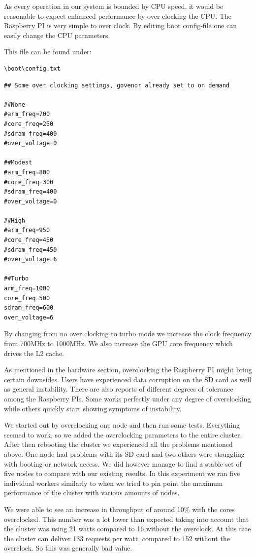 As every operation in our system is bounded by CPU speed, it would be reasonable to expect enhanced performance by over clocking the CPU. The Raspberry PI is very simple to over clock. By editing boot config-file one can easily change the CPU parameters.

This file can be found under:

\begin{lstlisting}
\boot\config.txt
\end{lstlisting} 

\begin{lstlisting}
## Some over clocking settings, govenor already set to on demand

##None
#arm_freq=700
#core_freq=250
#sdram_freq=400
#over_voltage=0

##Modest
#arm_freq=800
#core_freq=300
#sdram_freq=400
#over_voltage=0

##High
#arm_freq=950
#core_freq=450
#sdram_freq=450
#over_voltage=6

##Turbo
arm_freq=1000
core_freq=500
sdram_freq=600
over_voltage=6
\end{lstlisting}

By changing from no over clocking to turbo mode we increase the clock frequency from 700MHz to 1000MHz. We also increase the GPU core frequency which drives the L2 cache.

As mentioned in the hardware section, overclocking the Raspberry PI might bring certain downsides. Users have experienced data corruption on the SD card as well as general instability. There are also reports of different degrees of tolerance among the Raspberry PIs. Some works perfectly under any degree of overclocking while others quickly start showing symptoms of instability.

We started out by overclocking one node and then run some tests. Everything seemed to work, so we added the overclocking parameters to the entire cluster. After then rebooting the cluster we experienced all the problems mentioned above. One node had problems with its SD-card and two others were struggling with booting or network access. We did however manage to find a stable set of five nodes to compare with our existing results. In this experiment we ran five individual workers similarly to when we tried to pin point the maximum performance of the cluster with various amounts of nodes. 

We were able to see an increase in throughput of around 10\% with the cores overclocked. This number was a lot lower than expected taking into account that the cluster was using 21 watts compared to 16 without the overclock. At this rate the cluster can deliver 133 requests per watt, compared to 152 without the overclock. So this was generally bad value.


